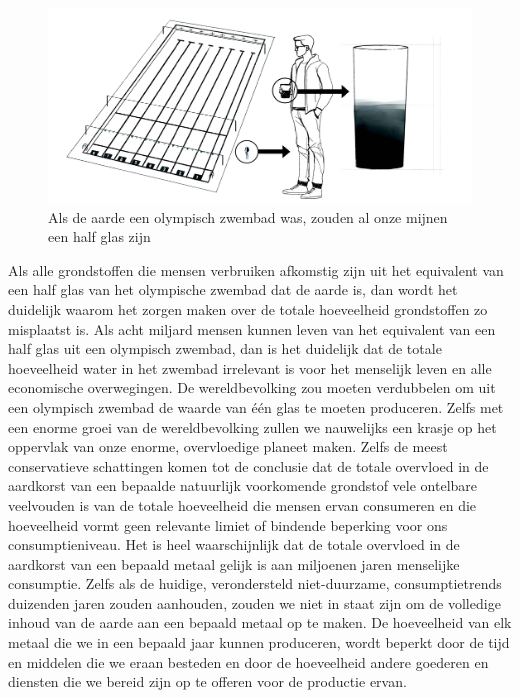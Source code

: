 \begin{figure}[!htb]
\centering
    \includegraphics[width=\textwidth]{figures/fig3.pdf}
\caption[Als de aarde een olympisch zwembad was, zouden al
onze mijnen een half glas zijn]{Als de aarde een olympisch zwembad was, zouden al
onze mijnen een half glas zijn}
\label{fig3}
\end{figure}

Als alle grondstoffen die mensen verbruiken afkomstig zijn uit het
equivalent van een half glas van het olympische zwembad dat de aarde is,
dan wordt het duidelijk waarom het zorgen maken over de totale
hoeveelheid grondstoffen zo misplaatst is. Als acht miljard mensen
kunnen leven van het equivalent van een half glas uit een olympisch
zwembad, dan is het duidelijk dat de totale hoeveelheid water in het
zwembad irrelevant is voor het menselijk leven en alle economische
overwegingen. De wereldbevolking zou moeten verdubbelen om uit een
olympisch zwembad de waarde van één glas te moeten produceren. Zelfs met
een enorme groei van de wereldbevolking zullen we nauwelijks een krasje
op het oppervlak van onze enorme, overvloedige planeet maken. Zelfs de
meest conservatieve schattingen komen tot de conclusie dat de totale
overvloed in de aardkorst van een bepaalde natuurlijk voorkomende
grondstof vele ontelbare veelvouden is van de totale hoeveelheid die
mensen ervan consumeren en die hoeveelheid vormt geen relevante limiet
of bindende beperking voor ons consumptieniveau. Het is heel
waarschijnlijk dat de totale overvloed in de aardkorst van een bepaald
metaal gelijk is aan miljoenen jaren menselijke consumptie. Zelfs als de
huidige, verondersteld niet-duurzame, consumptietrends duizenden jaren
zouden aanhouden, zouden we niet in staat zijn om de volledige inhoud
van de aarde aan een bepaald metaal op te maken. De hoeveelheid van elk metaal die we in een bepaald jaar kunnen produceren, wordt beperkt door de tijd en middelen die we eraan besteden en door de hoeveelheid andere goederen en diensten die we bereid zijn op te offeren voor de productie ervan.


